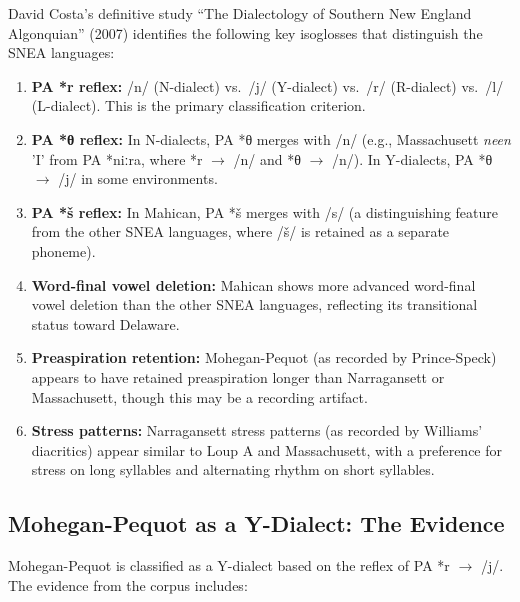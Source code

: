 David Costa's definitive study ``The Dialectology of Southern New England
Algonquian'' (2007) identifies the following key isoglosses that distinguish
the SNEA languages:

\begin{enumerate}
  \item \textbf{PA *r reflex:} /n/ (N-dialect) vs.\ /j/ (Y-dialect) vs.\
    /r/ (R-dialect) vs.\ /l/ (L-dialect). This is the primary
    classification criterion.

  \item \textbf{PA *θ reflex:} In N-dialects, PA *θ merges with /n/ (e.g.,
    Massachusett \textit{neen} 'I' from PA *niːra, where *r $\rightarrow$ /n/
    and *θ $\rightarrow$ /n/). In Y-dialects, PA *θ $\rightarrow$ /j/ in some
    environments.

  \item \textbf{PA *š reflex:} In Mahican, PA *š merges with /s/ (a
    distinguishing feature from the other SNEA languages, where /š/ is
    retained as a separate phoneme).

  \item \textbf{Word-final vowel deletion:} Mahican shows more advanced
    word-final vowel deletion than the other SNEA languages, reflecting its
    transitional status toward Delaware.

  \item \textbf{Preaspiration retention:} Mohegan-Pequot (as recorded by
    Prince-Speck) appears to have retained preaspiration longer than
    Narragansett or Massachusett, though this may be a recording artifact.

  \item \textbf{Stress patterns:} Narragansett stress patterns (as recorded
    by Williams' diacritics) appear similar to Loup A and Massachusett,
    with a preference for stress on long syllables and alternating rhythm on
    short syllables.
\end{enumerate}

\subsection{Mohegan-Pequot as a Y-Dialect: The Evidence}

Mohegan-Pequot is classified as a Y-dialect based on the reflex of PA *r
$\rightarrow$ /j/. The evidence from the corpus includes:

